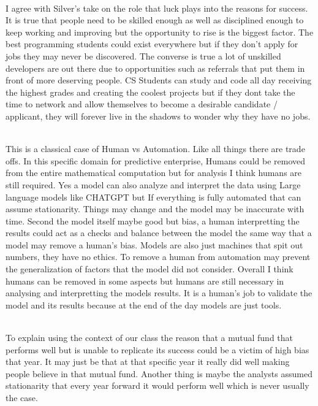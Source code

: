 \documentclass[12pt]{article}
\begin{document}
\begin{enumerate}
 \\ 
I agree with Silver's take on the role that luck plays into the reasons for success. It is true that people need to be skilled enough as well as disciplined enough to keep working and improving but the opportunity to rise is the biggest factor. The best programming students could exist everywhere but if they don't apply for jobs they may never be discovered. The converse is true a lot of unskilled developers are out there due to opportunities such as referrals that put them in front of more deserving people. CS Students can study and code all day receiving the highest grades and creating the coolest projects but if they dont take the time to network and allow themselves to become a desirable candidate / applicant, they will forever live in the shadows to wonder why they have no jobs. 

 \\ 
This  is a classical case of Human vs Automation. Like all things there are trade offs. In this specific domain for predictive enterprise, Humans could be removed from the entire mathematical computation but for analysis I think humans are still required. Yes a model can also analyze and interpret the data using Large language models like CHATGPT but If everything is fully automated that can assume stationarity. Things may change and the model may be inaccurate with time. Second the model itself maybe good but bias, a human interpretting the results could act as a checks and balance between the model the same way that a model may remove a human's bias. Models are also just machines that spit out numbers, they have no ethics. To remove a human from automation may prevent the generalization of factors that the model did not consider. Overall I think humans can be removed in some aspects but humans are still necessary in analysing and interpretting the models results. It is a human's job to validate the model and its results because at the end of the day models are just tools. 

 \\ 
To explain using the context of our class the reason that a mutual fund that performs well but is unable to replicate its success could be a victim of high bias that year. It may just be that at that specific year it really did well making people believe in that mutual fund. Another thing is maybe the analysts assumed stationarity that every year forward it would perform well which is never usually the case. 


\end{enumerate}
\end{document}

